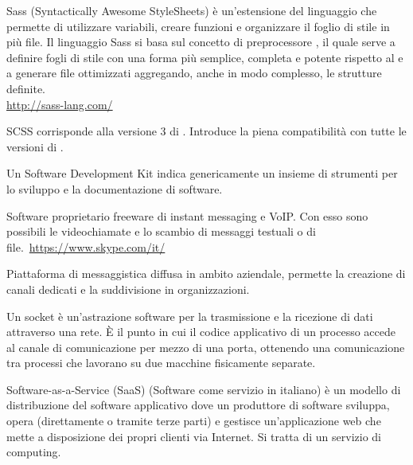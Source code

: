 Sass (Syntactically Awesome StyleSheets) è un'estensione del linguaggio  che permette di utilizzare variabili, creare funzioni e organizzare il foglio di stile in più file. Il linguaggio Sass si basa sul concetto di preprocessore , il quale serve a definire fogli di stile con una forma più semplice, completa e potente rispetto al  e a generare file  ottimizzati aggregando, anche in modo complesso, le strutture definite.\\
\url{http://sass-lang.com/}

SCSS corrisponde alla versione 3 di . Introduce la piena compatibilità con tutte le versioni di .

Un Software Development Kit indica genericamente un insieme di strumenti per lo sviluppo e la documentazione di software.

Software proprietario freeware di instant messaging e VoIP. Con esso sono possibili le videochiamate e lo scambio di messaggi testuali o di file.\
\url{https://www.skype.com/it/}

Piattaforma di messaggistica diffusa in ambito aziendale, permette la creazione di canali dedicati e la suddivisione in organizzazioni. 

Un socket è un'astrazione software per la trasmissione e la ricezione di dati attraverso una rete. È il punto in cui il codice applicativo di un processo accede al canale di comunicazione per mezzo di una porta, ottenendo una comunicazione tra processi che lavorano su due macchine fisicamente separate.

Software-as-a-Service (SaaS) (Software come servizio in italiano) è un modello di distribuzione del software applicativo dove un produttore di software sviluppa, opera (direttamente o tramite terze parti) e gestisce un'applicazione web che mette a disposizione dei propri clienti via Internet. Si tratta di un servizio di  computing.

